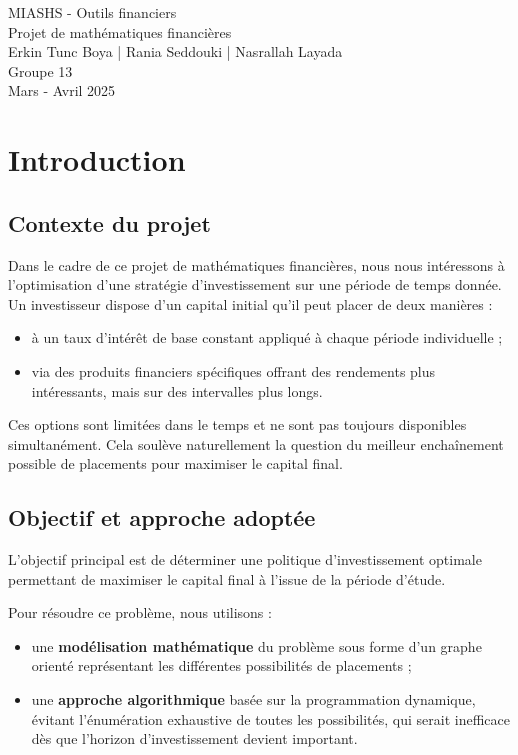 \documentclass[a4paper,11pt]{article}
\begin{document}
\begin{center}
	\Huge{MIASHS - Outils financiers}\\[0.5cm]
	\LARGE{Projet de mathématiques financières}\\[0.2cm]
	\Large{Erkin Tunc Boya | Rania Seddouki |  Nasrallah Layada }\\
	\Large{Groupe 13} \\
	\Large{Mars - Avril 2025}
\end{center}

\tableofcontents
\section{Introduction}

\subsection{Contexte du projet}

Dans le cadre de ce projet de mathématiques financières, nous nous intéressons à l’optimisation d’une stratégie d’investissement sur une période de temps donnée. Un investisseur dispose d’un capital initial qu’il peut placer de deux manières :
\begin{itemize}
	\item à un taux d’intérêt de base constant appliqué à chaque période individuelle ;
	\item via des produits financiers spécifiques offrant des rendements plus intéressants, mais sur des intervalles plus longs.
\end{itemize}

Ces options sont limitées dans le temps et ne sont pas toujours disponibles simultanément. Cela soulève naturellement la question du meilleur enchaînement possible de placements pour maximiser le capital final.

\subsection{Objectif et approche adoptée}

L’objectif principal est de déterminer une politique d’investissement optimale permettant de maximiser le capital final à l’issue de la période d’étude.

Pour résoudre ce problème, nous utilisons :
\begin{itemize}
	\item une \textbf{modélisation mathématique} du problème sous forme d’un graphe orienté représentant les différentes possibilités de placements ;
	\item une \textbf{approche algorithmique} basée sur la programmation dynamique, évitant l’énumération exhaustive de toutes les possibilités, qui serait inefficace dès que l’horizon d’investissement devient important.
\end{itemize}
\end{document}
